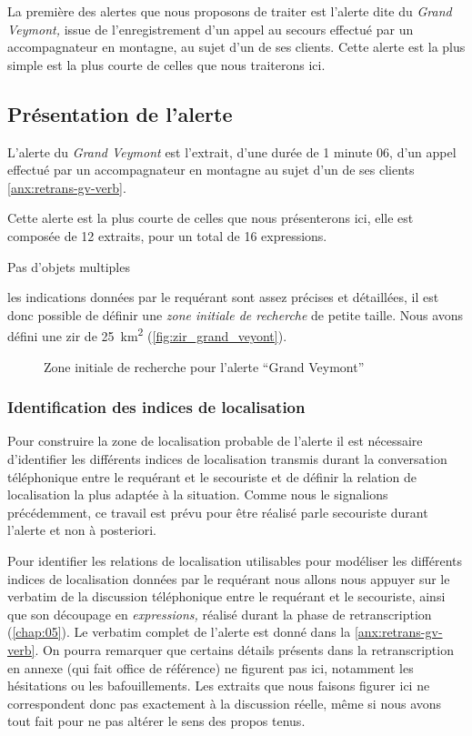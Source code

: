 La première des alertes que nous proposons de traiter est l'alerte
dite du \emph{Grand Veymont,} issue de l'enregistrement d'un appel au
secours effectué par un accompagnateur en montagne, au sujet d'un de
ses clients.
%
Cette alerte est la plus simple est la plus courte de celles que nous
traiterons ici.

\subsection{Présentation de l'alerte}
\label{subsec:9-2-1}

L'alerte du \emph{Grand Veymont} est l'extrait, d'une durée de 1
minute 06, d'un appel effectué par un accompagnateur en montagne au
sujet d'un de ses clients \autoref{anx:retrans-gv-verb}.


Cette alerte est la plus courte de celles que nous présenterons ici,
elle est composée de 12 extraits, pour un total de 16 expressions.



Pas d'objets multiples

les indications données par le requérant sont assez précises et
détaillées, il est donc possible de définir une \emph{zone initiale de
  recherche} de petite taille. Nous avons défini une \ac{zir} de
\SI{25}{\kilo\meter\squared} (\autoref{fig:zir_grand_veyont}).

\begin{figure}
  \centering
  
  \caption{Zone initiale de recherche pour l'alerte \enquote{Grand Veymont}}
  \label{fig:zir_grand_veyont}
\end{figure}


\subsubsection{Identification des indices de localisation}
\label{subsec:9-2-1-1}


Pour construire la zone de localisation probable de l'alerte il est
nécessaire d'identifier les différents indices de localisation
transmis durant la conversation téléphonique entre le requérant et le
secouriste et de définir la relation de localisation la plus adaptée à
la situation. Comme nous le signalions précédemment, ce travail est
prévu pour être réalisé parle secouriste durant l'alerte et non à
posteriori.

Pour identifier les relations de localisation utilisables pour
modéliser les différents indices de localisation données par le
requérant nous allons nous appuyer sur le verbatim de la discussion
téléphonique entre le requérant et le secouriste, ainsi que son
découpage en \emph{expressions,} réalisé durant la phase de
retranscription (\autoref{chap:05}). Le verbatim complet de l'alerte
est donné dans la \autoref{anx:retrans-gv-verb}. On pourra remarquer
que certains détails présents dans la retranscription en annexe (qui
fait office de référence) ne figurent pas ici, notamment les
hésitations ou les bafouillements. Les extraits que nous faisons
figurer ici ne correspondent donc pas exactement à la discussion
réelle, même si nous avons tout fait pour ne pas altérer le sens des
propos tenus.


